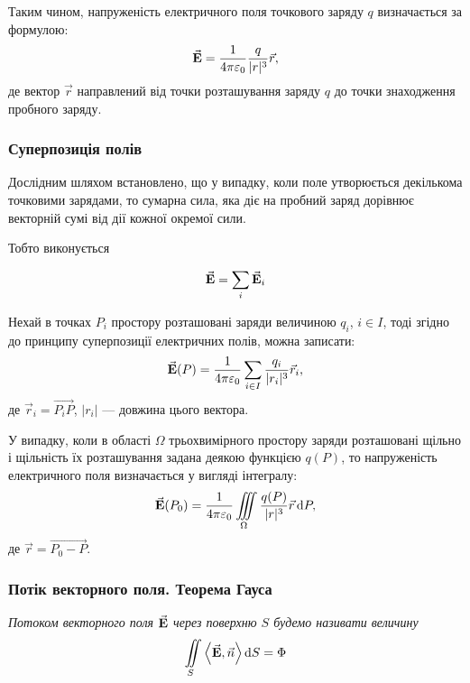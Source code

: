 Таким чином,  напруженість електричного поля точкового заряду $q$ визначається за формулою:
\begin{equation}
	{\vec{\mathbf{E}}} = \frac{1}{4 \pi \varepsilon_0} \frac{q}{|r|^3} \vec r,
\end{equation}
де вектор $\vec r$ направлений від точки розташування заряду $q$ до точки знаходження пробного заряду. 

\subsubsection{Суперпозиція полів}

Дослідним шляхом встановлено, що у випадку, коли поле утворюється декількома точковими зарядами, то сумарна сила, яка діє на пробний заряд дорівнює векторній сумі від дії кожної окремої сили. \medskip

Тобто виконується
\begin{th_principle}
	\begin{equation}
		{\vec{\mathbf{E}}} = \displaystyle\sum\limits_i {\vec{\mathbf{E}}}_i	
	\end{equation}
\end{th_principle}

Нехай в точках $P_i$ простору розташовані заряди величиною $q_i$, $i \in I$, тоді згідно до принципу суперпозиції електричних полів, можна записати:
\begin{equation}
	{\vec{\mathbf{E}}}(P) = \frac{1}{4 \pi \varepsilon_0} \displaystyle\sum\limits_{i \in I} \frac{q_i}{|r_i|^3} \vec r_i,
\end{equation}
де $\vec r_i = \overrightarrow{P_iP}$, $|r_i|$ --- довжина цього вектора. \medskip

У випадку, коли в області $\Omega$ трьохвимірного простору заряди розташовані щільно і щільність їх розташування задана деякою функцією $q(P)$, то напруженість електричного поля визначається у вигляді інтегралу:
\begin{equation}
	{\vec{\mathbf{E}}}(P_0) = \frac{1}{4 \pi \varepsilon_0} \displaystyle\iiint\limits_\Omega \frac{q(P)}{|r|^3} \vec r \mathop{}\!\mathrm{d} P,
\end{equation}
де $\vec r =\overrightarrow{ P_0 - P}$.

\subsubsection{Потік векторного поля. Теорема Гауса}

\begin{definition}
	\it{Потоком векторного поля} ${\vec{\mathbf{E}}}$ через поверхню $S$ будемо називати величину
	\begin{equation}
		\Iint_S \langle \vecf E, \vec n \rangle \diff S = \Phi
	\end{equation}
\end{definition}

